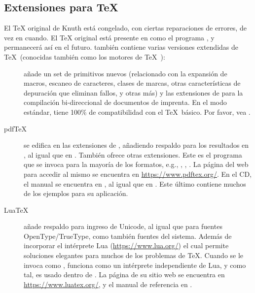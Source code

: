 \documentclass{article}
\begin{document}
\subsection{Extensiones para \protect\TeX}
\label{sec:tex-extensions}

El \TeX{} original de Knuth está congelado, con ciertas reparaciones
de errores, de vez en cuando. El \TeX{} original está presente en \TL{} como el
programa , y permanecerá así en el futuro. \TL{} también contiene
varias versiones extendidas de \TeX\ (conocidas también como los motores de
\TeX\ ):

\begin{description}

\item [\eTeX] añade un set de primitivos nuevos
\label{text:etex} (relacionado con la expansión de macros, escaneo de
caracteres, clases de marcas, otras características de depuración que
eliminan fallos, y otras más) y las extensiones de \TeXXeT{} para la
compilación bi-direccional de documentos de imprenta. En el modo
estándar, \eTeX{} tiene 100\% de compatibilidad con el \TeX\
básico.
Por favor, vea .

\item [pdf\TeX] se edifica en las extensiones de \eTeX{}, añadiendo
	respaldo para los resultados en \acro{PDF}, al igual que en
	\dvi{}. También ofrece otras extensiones. Este es el programa
	que se invoca para la mayoría de los formatos, e.g.,
	, , . La página del web
	para accedir al mismo se encuentra en
	\url{https://www.pdftex.org/}. En el CD, el manual se encuentra
	en , al igual
	que en
	.
	Este último contiene muchos de los ejemplos para su
	aplicación.

\item [Lua\TeX] añade respaldo para ingreso de Unicode, al igual que para fuentes OpenType\slash TrueType, como también fuentes del sistema. Además de incorporar el intérprete Lua
	(\url{https://www.lua.org/}) el cual permite soluciones elegantes para
	muchos de los problemas de \TeX{}. Cuando se le invoca como
	, funciona como un intérprete independiente
	de Lua, y como tal, es usado dentro de \TL{}. La página de su
	sitio web se encuentra en \url{https://www.luatex.org/}, y el
	manual de referencia en
	.


\end{description}
\end{document}
